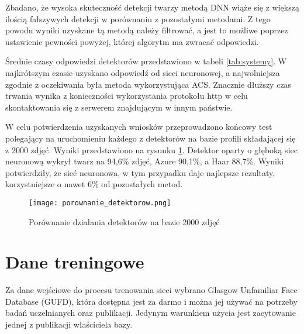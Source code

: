 Zbadano, że wysoka skuteczność detekcji twarzy metodą DNN wiąże się z większą ilością fałszywych detekcji w porównaniu z pozostałymi metodami. Z tego powodu wyniki uzyskane tą metodą należy filtrować, a jest to możliwe poprzez ustawienie pewności powyżej, której algorytm ma zwracać odpowiedzi.

Średnie czasy odpowiedzi detektorów przedstawiono w tabeli \ref{tab:systemy}. W najkrótszym czasie uzyskano odpowiedź od sieci neuronowej, a najwolniejsza zgodnie z oczekiwania była metoda wykorzystująca ACS. Znacznie dłuższy czas trwania wynika z konieczności wykorzystania protokołu http w celu skontaktowania się z serwerem znajdującym w innym państwie.

\begin{table}[H]\label{tab:detekcja_czasy}
	\centering
	\caption{Średni czas przetwarzania zadania detekcji twarzy}
\end{table}

W celu potwierdzenia uzyskanych wniosków przeprowadzono końcowy test polegający na uruchomieniu każdego z detektorów na bazie profili składającej się z 2000 zdjęć. Wyniki przedstawiono na rysunku \ref{fig:porownanie_detektorow}. Detektor oparty o głęboką siec neuronową wykrył twarz na 94,6\% zdjęć, Azure 90,1\%, a Haar 88,7\%. Wyniki potwierdziły, że sieć neuronowa, w tym przypadku daje najlepsze rezultaty, korzystniejsze o nawet 6\% od pozostałych metod.

\begin{figure}[H]
	\centering
	\texttt{[image: porownanie\_detektorow.png]}
	\caption{Porównanie działania detektorów na bazie 2000 zdjęć}
	\label{fig:porownanie_detektorow}
\end{figure}

\section{Dane treningowe}
Za dane wejściowe do procesu trenowania sieci wybrano Glasgow Unfamiliar Face Database (GUFD)\cite{glasgow}, która dostępna jest za darmo i można jej używać na potrzeby badań uczelnianych oraz publikacji. Jedynym warunkiem użycia jest zacytowanie jednej z publikacji właściciela bazy.

